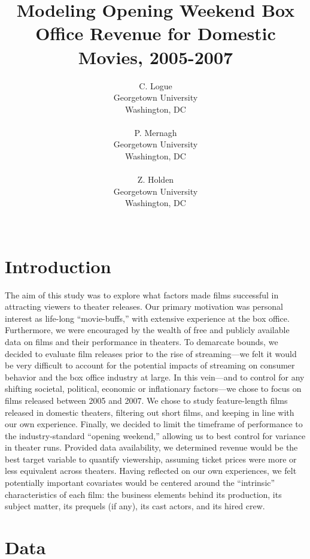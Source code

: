 \documentclass[10pt]{article}
\title{Modeling Opening Weekend Box Office Revenue for Domestic Movies, 2005-2007}
\author{
  C. Logue \\
  Georgetown University \\
  Washington, DC \\
\\\And
  P. Mernagh \\
  Georgetown University \\
  Washington, DC \\
\\\And
  Z. Holden \\
  Georgetown University \\
  Washington, DC \\
\\}
\begin{document}
\maketitle

\section{Introduction}
The aim of this study was to explore what factors made films successful in attracting viewers to theater releases. Our primary motivation was personal interest as life-long “movie-buffs,” with extensive experience at the box office. Furthermore, we were encouraged by the wealth of free and publicly available data on films and their performance in theaters.
To demarcate bounds, we decided to evaluate film releases prior to the rise of streaming—we felt it would be very difficult to account for the potential impacts of streaming on consumer behavior and the box office industry at large. In this vein—and to control for any shifting societal, political, economic or inflationary factors—we chose to focus on films released between 2005 and 2007. We chose to study feature-length films released in domestic theaters, filtering out short films, and keeping in line with our own experience. Finally, we decided to limit the timeframe of performance to the industry-standard “opening weekend,” allowing us to best control for variance in theater runs.
Provided data availability, we determined revenue would be the best target variable to quantify viewership, assuming ticket prices were more or less equivalent across theaters. 
Having reflected on our own experiences, we felt potentially important covariates would be centered around the “intrinsic” characteristics of each film: the business elements behind its production, its subject matter, its prequels (if any), its cast actors, and its hired crew.  
\section{Data}
\end{document}
